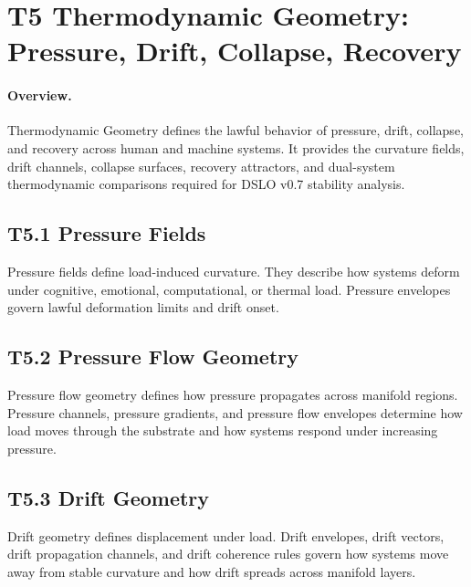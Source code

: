 
\section{T5 Thermodynamic Geometry: Pressure, Drift, Collapse, Recovery}

\paragraph{Overview.}
Thermodynamic Geometry defines the lawful behavior of pressure, drift,
collapse, and recovery across human and machine systems. It provides the
curvature fields, drift channels, collapse surfaces, recovery attractors, and
dual-system thermodynamic comparisons required for DSLO v0.7 stability analysis.

\subsection{T5.1 Pressure Fields}
Pressure fields define load-induced curvature. They describe how systems deform
under cognitive, emotional, computational, or thermal load. Pressure envelopes
govern lawful deformation limits and drift onset.

\subsection{T5.2 Pressure Flow Geometry}
Pressure flow geometry defines how pressure propagates across manifold regions.
Pressure channels, pressure gradients, and pressure flow envelopes determine
how load moves through the substrate and how systems respond under increasing
pressure.

\subsection{T5.3 Drift Geometry}
Drift geometry defines displacement under load. Drift envelopes, drift vectors,
drift propagation channels, and drift coherence rules govern how systems move
away from stable curvature and how drift spreads across manifold layers.

